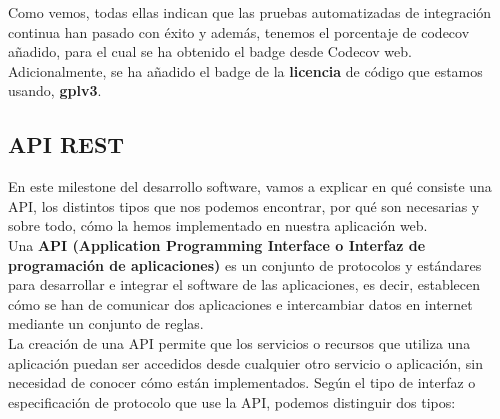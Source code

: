 Como vemos, todas ellas indican que las pruebas automatizadas de integración continua han
pasado con éxito y además, tenemos el porcentaje de codecov añadido, para el cual se ha
obtenido el badge desde Codecov web. Adicionalmente, se ha añadido el badge de la
\textbf{licencia} de código que estamos usando, \textbf{gplv3}.

\subsection{API REST}
En este milestone del desarrollo software, vamos a explicar en qué consiste una API, los
distintos tipos que nos podemos encontrar, por qué son necesarias y sobre todo, cómo la
hemos implementado en nuestra aplicación web.\\

Una \textbf{API \cite{api} (Application Programming Interface o Interfaz de programación
de aplicaciones)} es un conjunto de protocolos y estándares para desarrollar e integrar el
software de las aplicaciones, es decir, establecen cómo se han de comunicar dos
aplicaciones e intercambiar datos en internet mediante un conjunto de reglas.\\

La creación de una API permite que los servicios o recursos que utiliza una aplicación
puedan ser accedidos desde cualquier otro servicio o aplicación, sin necesidad de
conocer cómo están implementados. Según el tipo de interfaz o especificación de protocolo
que use la API, podemos distinguir dos tipos:

